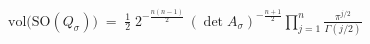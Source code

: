 \documentclass[border=8pt,varwidth=40cm]{standalone}
\begin{document}
\(\displaystyle
\mathrm{vol}\bigl(\mathrm{SO}(Q_\sigma)\bigr) \;=\; \frac{1}{2}\; 2^{-\frac{n(n-1)}{2}}\, (\det A_\sigma)^{-\frac{n+1}{2}} \prod_{j=1}^{n} \frac{\pi^{j/2}}{\Gamma(j/2)}
\)
\end{document}
